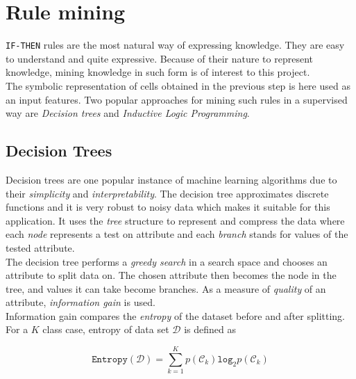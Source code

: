 
\chapter{Rule mining} %

\label{Chapter7} %


\texttt{IF-THEN} rules are the most natural way of expressing knowledge. They are easy to understand and quite expressive. Because of their nature to represent knowledge, mining knowledge in such form is of interest to this project. \\

The symbolic representation of cells obtained in the previous step is here used as an input features. Two popular approaches for mining such rules in a supervised way are \textit{Decision trees} and \textit{Inductive Logic Programming}.




\section{Decision Trees}

Decision trees are one popular instance of machine learning algorithms due to their \textit{simplicity} and \textit{interpretability}. The decision tree approximates discrete functions and it is very robust to noisy data which makes it suitable for this application. It uses the \textit{tree} structure to represent and compress the data where each \textit{node} represents a test on attribute and each \textit{branch} stands for values of the tested attribute. \\

The decision tree performs a \textit{greedy search} in a search space and chooses an attribute to split data on. The chosen attribute then becomes the node in the tree, and values it can take become branches. As a measure of \textit{quality} of an attribute, \textit{information gain} is used. \\

Information gain compares the \textit{entropy} of the dataset before and after splitting. For a $K$ class case, entropy of data set $\mathcal{D}$ is defined as

\begin{equation}
	\mathtt{Entropy}(\mathcal{D}) = \sum_{k=1}^K p(\mathcal{C}_k)\mathtt{log}_2 p(\mathcal{C}_k)
\end{equation}

